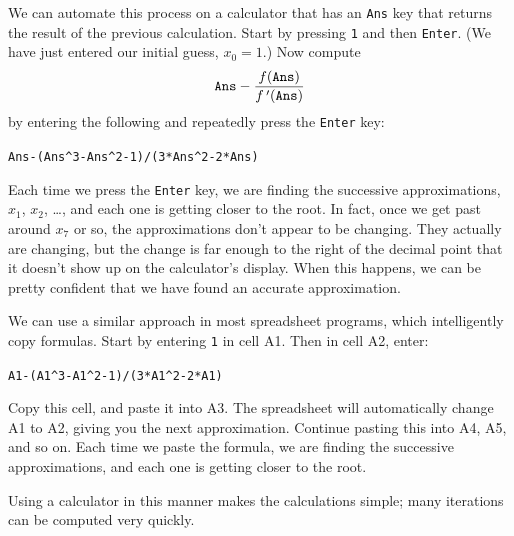 We can automate this process on a calculator that has an \verb+Ans+ key that returns the result of the previous calculation.  Start by pressing \verb+1+ and then \texttt{Enter}. (We have just entered our initial guess, $x_0=1$.)  Now  compute \[\texttt{Ans}-\frac{f(\texttt{Ans})}{f\,'(\texttt{Ans})}\]
by entering the following and repeatedly press the \texttt{Enter} key:
\begin{center}
\verb+Ans-(Ans^3-Ans^2-1)/(3*Ans^2-2*Ans)+
\end{center}
Each time we press the \texttt{Enter} key, we are finding the successive approximations, $x_1$, $x_2$, \dots, and each one is getting closer to the root.  In fact, once we get past around $x_7$ or so, the approximations don't appear to be changing.  They actually are changing, but the change is far enough to the right of the decimal point that it doesn't show up on the calculator's display.  When this happens, we can be pretty confident that we have found an accurate approximation.

We can use a similar approach in most spreadsheet programs, which intelligently copy formulas.  Start by entering \verb+1+ in cell A1.  Then in cell A2, enter:
\begin{center}
\verb+A1-(A1^3-A1^2-1)/(3*A1^2-2*A1)+
\end{center}
Copy this cell, and paste it into A3.  The spreadsheet will automatically change A1 to A2, giving you the next approximation.  Continue pasting this into A4, A5, and so on.  Each time we paste the formula, we are finding the successive approximations, and each one is getting closer to the root.

Using a calculator in this manner makes the calculations simple; many iterations can be computed very quickly.


